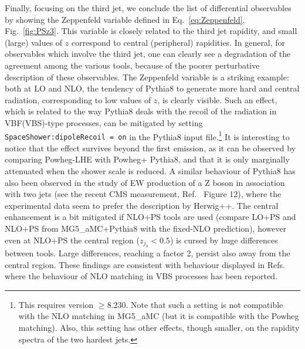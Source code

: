 \documentclass[twocolumn,epjc3]{svjour3} %
\newcommand{\PZ}{\ensuremath{\text{Z}}\xspace}
\providecommand{\DIFaddtex}[1]{{\protect\color{blue}\uwave{#1}}} %
\providecommand{\DIFaddbegin}{} %
\providecommand{\DIFaddend}{} %
\providecommand{\DIFadd}[1]{\texorpdfstring{\DIFaddtex{#1}}{#1}} %
\begin{document}
Finally, focusing on the third jet, we conclude the list of differential observables by showing the Zeppenfeld variable defined in Eq.~\eqref{eq:Zeppenfeld}, Fig.~\ref{fig:PSz3}. This
variable is closely related to the third jet rapidity, and small (large) values of $z$ correspond to central (peripheral) rapidities. In general, for observables which involve the third jet, one
can clearly see a degradation of the agreement among the various tools, because of the poorer perturbative description of these observables. The Zeppenfeld variable is
a striking example: both at LO and NLO, the tendency of {\sc Pythia8} to generate more hard and central radiation, corresponding to low values of $z$,
is clearly visible. Such an effect, which is related to the way {\sc Pythia8} deals with the recoil of the radiation in VBF(VBS)-type processes,
can be mitigated by setting {\tt SpaceShower:dipole\-Recoil = on} in the {\sc Pythia8} input file.\footnote{This requires version $\ge8.230$.
Note that such a setting is not compatible with the NLO matching
in {\sc MG5\_aMC} (but it is compatible with the {\sc Powheg} matching). Also, this setting has other
effects, though smaller, on the rapidity spectra of the two hardest jets.} It is interesting to notice that
the effect survives beyond the first emission, as it can be observed by comparing {\sc Powheg-LHE} with {\sc Powheg+ Pythia8}, and that
it is only marginally attenuated when the shower scale is reduced. A similar
behaviour of {\sc Pythia8}
has also been observed in the study of EW production of a $\PZ$ boson in association with two jets (see the recent CMS measurement,
Ref.~\cite{Sirunyan:2017jej} Figure 12), where the experimental data seem to prefer the description by {\sc Herwig++}\DIFaddbegin \DIFadd{~\mbox{%
\cite{Bahr:2008pv, Bellm:2013hwb}}%
}\DIFaddend .
The central enhancement
is a bit mitigated if NLO+PS tools are used (compare LO+PS and NLO+PS from {\sc MG5\_aMC+Pythia8} with the fixed-NLO prediction), however even at NLO+PS the central region
($z_{j_3}<0.5$) is cursed by huge differences between tools. Large differences, reaching a factor 2, persist also away from the central region. These findings are consistent with behaviour displayed in Refs.~\cite{Jager:2011ms,Jager:2012xk,Jager:2013mu,Jager:2013iza,Schissler:2013nga} where the behaviour of NLO matching in VBS processes has been reported.\\
\end{document}
